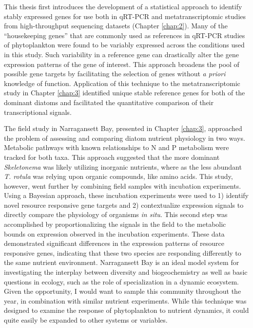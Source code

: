 \par
This thesis first introduces the development of a statistical approach to identify stably expressed genes for use both in qRT-PCR and metatranscriptomic studies from high-throughput sequencing datasets (Chapter \ref{chap:2}). Many of the ``housekeeping genes'' that are commonly used as references in qRT-PCR studies of phytoplankton were found to be variably expressed across the conditions used in this study. Such variability in a reference gene can drastically alter the gene expression patterns of the gene of interest. This approach broadens the pool of possible gene targets by facilitating the selection of genes without \textit{a priori} knowledge of function. Application of this technique to the metatranscriptomic study in Chapter \ref{chap:3} identified unique stable reference genes for both of the dominant diatoms and facilitated the quantitative comparison of their transcriptional signals. 
\par
The field study in Narragansett Bay, presented in Chapter \ref{chap:3}, approached the problem of assessing and comparing diatom nutrient physiology in two ways. Metabolic pathways with known relationships to N and P metabolism were tracked for both taxa. This approach suggested that the more dominant \textit{Skeletonema} was likely utilizing inorganic nutrients, where as the less abundant \textit{T. rotula} was relying upon organic compounds, like amino acids. This study, however, went further by combining field samples with incubation experiments. Using a Bayesian approach, these incubation experiments were used to 1) identify novel resource responsive gene targets and 2) contextualize expression signals to directly compare the physiology of organisms \textit{in situ}. This second step was accomplished by proportionalizing the signals in the field to the metabolic bounds on expression observed in the incubation experiments. These data demonstrated significant differences in the expression patterns of resource responsive genes, indicating that these two species are responding differently to the same nutrient environment. Narragansett Bay is an ideal model system for investigating the interplay between diversity and biogeochemistry as well as basic questions in ecology, such as the role of specialization in a dynamic ecosystem. Given the opportunity, I would want to sample this community throughout the year, in combination with similar nutrient experiments. While this technique was designed to examine the response of phytoplankton to nutrient dynamics, it could quite easily be expanded to other systems or variables. 
